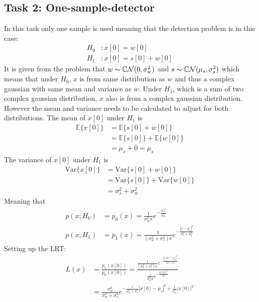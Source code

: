\subsection{Task 2: One-sample-detector}
In this task only one sample is used meaning that the detection problem is in this case:
\begin{align}
    H_0 &: x[0] = w[0]\nonumber\\
    H_1 &: x[0] = s[0]+w[0]\nonumber
\end{align}
It is given from the problem that $w\thicksim\mathbb{C}\mathcal{N}(0, \sigma_w^2)$ and $s\thicksim\mathbb{C}\mathcal{N}(\mu_s, \sigma_s^2)$ which means that under $H_0$, $x$ is from same distribution as $w$ and thus a complex gaussian with same mean and variance as $w$. Under $H_1$, which is a sum of two complex gaussian distribution, $x$ also is from a complex gaussian distribution. However the mean and variance needs to be calculated to adjust for both distributions.
The mean of $x[0]$ under $H_1$ is
\begin{align}
    \mathbb{E}\{x[0]\} & = \mathbb{E}\{s[0]+w[0]\}\nonumber\\
    & = \mathbb{E}\{s[0]\} + \mathbb{E}\{w[0]\}\nonumber\\
    & = \mu_s + 0 = \mu_s\nonumber
\end{align} 
The variance of $x[0]$ under $H_1$ is
\begin{align}
    \mathrm{Var}\{x[0]\} & = \mathrm{Var}\{s[0]+w[0]\}\nonumber\\
    & = \mathrm{Var}\{s[0]\} + \mathrm{Var}\{w[0]\}\nonumber\\
    & = \sigma_s^2+\sigma_w^2\nonumber
\end{align}
Meaning that
\begin{align}
    p(x;H_0) & = p_0(x) = \frac{1}{\sigma_w^2\pi}e^{-\frac{|x|^2}{\sigma_w^2}}\\
    p(x;H_1) & = p_1(x) = \frac{1}{(\sigma_w^2+\sigma_s^2)\pi}e^{-\frac{|x-\mu_s|^2}{\sigma_s^2+\sigma_w^2}}
\end{align}
Setting up the LRT:
\begin{align}
    L(x) & = \frac{p_1(x[0])}{p_0(x[0])} = \frac{\frac{1}{(\sigma_w^2+\sigma_s^2)\pi}e^{-\frac{|x[0]-\mu_s|^2}{\sigma_s^2+\sigma_w^2}}}{\frac{1}{\sigma_w^2\pi}e^{-\frac{|x[0]|^2}{\sigma_w^2}}}\nonumber\\
    & = \frac{\sigma_w^2}{\sigma_w^2+\sigma_s^2}e^{-\frac{1}{\sigma_w^2+\sigma_s^2}|x[0]-\mu_s|^2+\frac{1}{\sigma_w^2}|x[0]|^2}\nonumber
\end{align}
